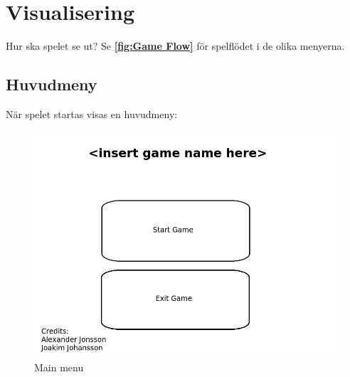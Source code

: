 \documentclass{TDP003mall}
\begin{document}
\newpage

\section{Visualisering}
Hur ska spelet se ut? Se \textbf{\ref{fig:Game Flow}} för spelflödet i de olika menyerna.
\subsection{Huvudmeny}
När spelet startas visas en huvudmeny:
\begin{figure}[H]
    \centering
    \includegraphics[width = \linewidth]{mainmenu.png}
    \caption{Main menu}
    \label{fig:Main menu}
\end{figure}

\newpage
\end{document}
